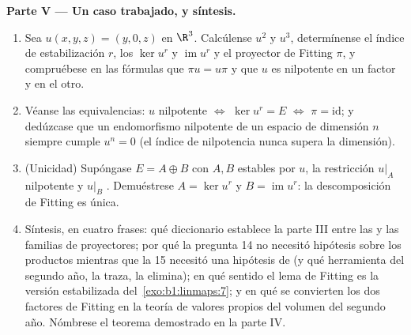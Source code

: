 \begin{problem}
\medskip
\noindent\textbf{Parte V --- Un caso trabajado, y síntesis.}
\begin{enumerate}[resume]
  \item Sea $u(x, y, z) = (y, 0, z)$ en $\R^3$. Calcúlense $u^2$ y
        $u^3$, determínense el índice de estabilización $r$, los
         $\ker u^{r}$ y $\operatorname{im} u^{r}$ y el
        proyector de Fitting $\pi$, y compruébese en las fórmulas que
        $\pi u = u\pi$ y que $u$ es nilpotente en un factor y
         en el otro.
  \item Véanse las equivalencias: $u$ nilpotente $\iff$
        $\ker u^{r} = E$ $\iff$ $\pi = \mathrm{id}$; y dedúzcase que
        un endomorfismo nilpotente de un espacio de dimensión $n$
        siempre cumple $u^{n} = 0$ (el índice de nilpotencia nunca
        supera la dimensión).
  \item (Unicidad) Supóngase $E = A \oplus B$ con $A, B$ estables
        por $u$, la restricción $u|_A$ nilpotente y $u|_B$
        . Demuéstrese $A = \ker u^{r}$ y
        $B = \operatorname{im} u^{r}$: la descomposición de Fitting
        es única.
  \item Síntesis, en cuatro frases: qué diccionario establece la
        parte III entre las  y las familias de
        proyectores; por qué la pregunta 14 no necesitó hipótesis
        sobre los productos mientras que la 15 necesitó una
        hipótesis de  (y qué herramienta del segundo año, la
        traza, la elimina); en qué sentido el lema de Fitting es la
        versión estabilizada del~\cref{exo:b1:linmaps:7}; y en qué se
        convierten los dos factores de Fitting en la teoría de
        valores propios del volumen del segundo año. Nómbrese el
        teorema demostrado en la parte IV.
\end{enumerate}
\end{problem}
